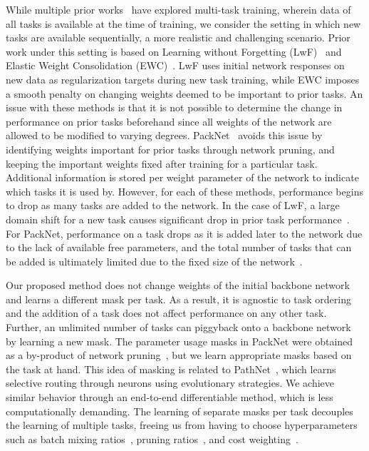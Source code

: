 \documentclass{llncs}
\begin{document}
While multiple prior works~\cite{bilen2016integrated,caruana1998multitask,kokkinos2016ubernet} have explored multi-task training, wherein data of all tasks is available at the time of training, we consider the setting in which new tasks are available sequentially, a more realistic and challenging scenario.
Prior work under this setting is based on Learning without Forgetting (LwF)~\cite{rannen2017encoder,li2016learning,shmelkov2017incremental} and Elastic Weight Consolidation (EWC)~\cite{kirkpatrick2017overcoming,lee2017overcoming}. LwF uses initial network responses on new data as regularization targets during new task training, while EWC imposes a smooth penalty on changing weights deemed to be important to prior tasks. An issue with these methods is that it is not possible to determine the change in performance on prior tasks beforehand since all weights of the network are allowed to be modified to varying degrees. PackNet~\cite{mallya2017packnet} avoids this issue by identifying weights important for prior tasks through network pruning, and keeping the important weights fixed after training for a particular task. Additional information is stored per weight parameter of the network to indicate which tasks it is used by. However, for each of these methods, performance begins to drop as many tasks are added to the network. In the case of LwF, a large domain shift for a new task causes significant drop in prior task performance~\cite{li2016learning}. For PackNet, performance on a task drops as it is added later to the network due to the lack of available free parameters, and the total number of tasks that can be added is ultimately limited due to the fixed size of the network~\cite{mallya2017packnet}. 

Our proposed method does not change weights of the initial backbone network and learns a different mask per task. As a result, it is agnostic to task ordering and the addition of a task does not affect performance on any other task. Further, an unlimited number of tasks can piggyback onto a backbone network by learning a new mask. 
The parameter usage masks in PackNet were obtained as a by-product of network pruning~\cite{han2015learning}, but we learn appropriate masks based on the task at hand.
This idea of masking is related to PathNet~\cite{fernando2017pathnet}, which learns selective routing through neurons using  evolutionary strategies. We achieve similar behavior through an end-to-end differentiable method, which is less computationally demanding. The learning of separate masks per task decouples the learning of multiple tasks, freeing us from having to choose hyperparameters such as batch mixing ratios~\cite{kokkinos2016ubernet}, pruning ratios~\cite{mallya2017packnet}, and cost weighting~\cite{li2016learning}.
\end{document}
